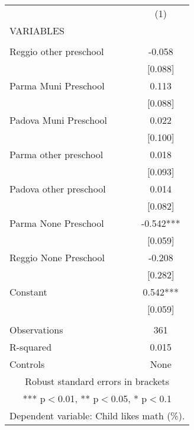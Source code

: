 \begin{tabular}{lc} \hline
 & (1) \\
VARIABLES &  \\ \hline
 &  \\
Reggio other preschool & -0.058 \\
 & [0.088] \\
Parma Muni Preschool & 0.113 \\
 & [0.088] \\
Padova Muni Preschool & 0.022 \\
 & [0.100] \\
Parma other preschool & 0.018 \\
 & [0.093] \\
Padova other preschool & 0.014 \\
 & [0.082] \\
Parma None Preschool & -0.542*** \\
 & [0.059] \\
Reggio None Preschool & -0.208 \\
 & [0.282] \\
Constant & 0.542*** \\
 & [0.059] \\
 &  \\
Observations & 361 \\
R-squared & 0.015 \\
 Controls & None \\ \hline
\multicolumn{2}{c}{ Robust standard errors in brackets} \\
\multicolumn{2}{c}{ *** p$<$0.01, ** p$<$0.05, * p$<$0.1} \\
\multicolumn{2}{c}{ Dependent variable: Child likes math (\%).} \\
\end{tabular}
